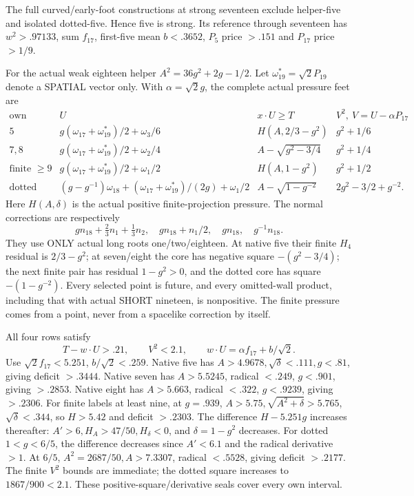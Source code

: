 \documentclass[11pt]{article}
\theoremstyle{definition}
\theoremstyle{remark}
\begin{document}
The full curved/early-foot
constructions at strong seventeen
exclude helper-five and isolated
dotted-five.
Hence five is strong.
Its reference through seventeen
has
\(w^2>.97133\), sum \(f_{17}\),
first-five mean \(b<.3652\),
\(P_5\) price \(>.151\) and
\(P_{17}\) price \(>1/9\).

For the actual weak eighteen
helper \(A^2=36g^2+2g-1/2\).
Let \(\omega_{19}^*=\sqrt2P_{19}\)
denote a SPATIAL vector only.
With \(\alpha=\sqrt2g\), the
complete actual pressure feet
are
\[
\begin{array}{c|c|c|c}
 \text{own}&U&x\cdot U\ge T&V^2,\ V=U-\alpha P_{17}\\ \hline
 5&g(\omega_{17}+\omega_{19}^*)/2+\omega_3/6&
          H(A,2/3-g^2)&g^2+1/6\\
 7,8&g(\omega_{17}+\omega_{19}^*)/2+\omega_2/4&
          A-\sqrt{g^2-3/4}&g^2+1/4\\
 \text{finite }\ge9&
       g(\omega_{17}+\omega_{19}^*)/2+\omega_1/2&
          H(A,1-g^2)&g^2+1/2\\
 \text{dotted}&
       (g-g^{-1})\omega_{18}
          +(\omega_{17}+\omega_{19}^*)/(2g)+\omega_1/2&
          A-\sqrt{1-g^{-2}}&2g^2-3/2+g^{-2}.
\end{array}
\]
Here \(H(A,\delta)\) is the actual
positive finite-projection pressure.
The normal corrections are respectively
\[
 g n_{18}+\tfrac23n_1+\tfrac13n_2,\quad
 g n_{18}+n_1/2,\quad
 g n_{18},\quad
 g^{-1}n_{18}.
\]
They use ONLY actual long roots
one/two/eighteen.
At native five their finite
\(H_4\) residual is \(2/3-g^2\);
at seven/eight the core has
negative square \(-(g^2-3/4)\);
the next finite pair has residual
\(1-g^2>0\), and the dotted core
has square \(-(1-g^{-2})\).
Every selected point is future,
and every omitted-wall product,
including that with actual SHORT
nineteen, is nonpositive.
The finite pressure comes from
a point, never from a spacelike
correction by itself.

All four rows satisfy
\[
          T-w\cdot U>.21,\qquad V^2<2.1,\qquad
                w\cdot U=\alpha f_{17}+b/\sqrt2 .
\tag{B19helper18}\label{app:exact19:eq:Bhelper18}
\]
Use \(\sqrt2f_{17}<5.251\),
\(b/\sqrt2<.259\).
Native five has
\(A>4.9678,\sqrt\delta<.111,g<.81\),
giving deficit \(>.3444\).
Native seven has
\(A>5.5245\), radical \(<.249\),
\(g<.901\), giving \(>.2853\).
Native eight has
\(A>5.663\), radical \(<.322\),
\(g<.9239\), giving \(>.2306\).
For finite labels at least nine,
at \(g=.939\),
\(A>5.75,\sqrt{A^2+\delta}>5.765\),
\(\sqrt\delta<.344\), so
\(H>5.42\) and deficit \(>.2303\).
The difference \(H-5.251g\)
increases thereafter:
\(A'>6,H_A>47/50,H_\delta<0\),
and \(\delta=1-g^2\) decreases.
For dotted \(1<g<6/5\),
the difference decreases since
\(A'<6.1\) and the radical
derivative \(>1\).
At \(6/5\),
\(A^2=2687/50,A>7.3307\),
radical \(<.5528\), giving
deficit \(>.2177\).
The finite \(V^2\) bounds are
immediate; the dotted square
increases to \(1867/900<2.1\).
These positive-square/derivative
seals cover every own interval.
\end{document}
